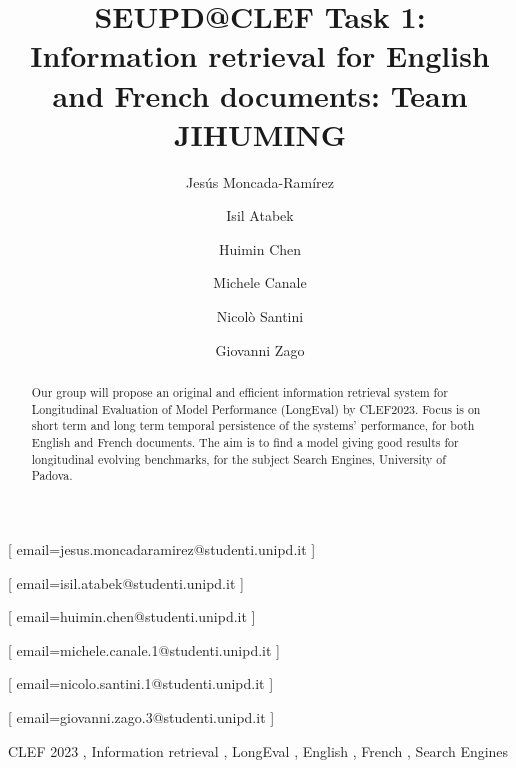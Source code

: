 \documentclass{ceurart}
\begin{document}


\title{SEUPD@CLEF Task 1: Information retrieval for English and French
documents: Team JIHUMING}

\author[1]{Jesús Moncada-Ramírez}[%
email=jesus.moncadaramirez@studenti.unipd.it
]

\author[1]{Isil Atabek}[%
email=isil.atabek@studenti.unipd.it
]

\author[1]{Huimin Chen}[%
email=huimin.chen@studenti.unipd.it
]

\author[1]{Michele	Canale}[%
email=michele.canale.1@studenti.unipd.it
]

\author[1]{Nicolò Santini}[%
email=nicolo.santini.1@studenti.unipd.it
]

\author[1]{Giovanni Zago}[%
email=giovanni.zago.3@studenti.unipd.it
]


\begin{abstract}
  Our group will propose an original and efficient information retrieval
  system for Longitudinal Evaluation of Model Performance (LongEval)
  by CLEF2023\cite{LongEval}. Focus is on short term and long term
  temporal persistence of the systems'  performance,
  for both English and French documents. The aim is to find a model giving
  good results for longitudinal evolving benchmarks,
  for the subject Search Engines, University of Padova.
\end{abstract}

\begin{keywords}
  CLEF 2023 \sep
  Information retrieval \sep
  LongEval \sep
  English \sep
  French \sep
  Search Engines
\end{keywords}
\end{document}
